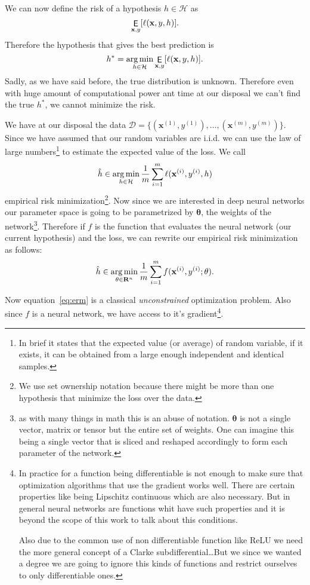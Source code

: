 \documentclass{sapthesis}
\begin{document}
We can now define the risk of a hypothesis $h \in \mathcal H$ as
\begin{displaymath}
	\mathop\mathsf E_{\mathbf x, y}[\ell(\mathbf x, y, h)] \mathrm .
\end{displaymath}
Therefore the hypothesis that gives the best prediction is
\begin{displaymath}
	h^* = \mathop{\mathrm{arg\,min}}_{h \in \mathcal H} \mathop\mathsf E_{\mathbf x, y}[\ell(\mathbf x, y, h)] \mathrm .
\end{displaymath}
Sadly, as we have said before, the true distribution is unknown. Therefore even
with huge amount of computational power ant time at our disposal we can't find
the true $h^*$, we cannot minimize the risk.

We have at our disposal the data $\mathcal D = \{(\mathbf x^{(1)}, y^{(1)}),
\ldots, (\mathbf x^{(m)}, y^{(m)})\}$. Since we have assumed that our random
variables are i.i.d. we can use the law of large numbers\footnote{In brief it
states that the expected value (or average) of random variable, if it exists, it
can be obtained from a large enough independent and identical samples.} to
estimate the expected value of the loss. We call
\begin{displaymath}
	\hat h \in \mathop{\mathrm{arg\,min}}_{h \in \mathcal H} \frac 1 m
		\sum_{i=1}^m \ell(\mathbf x^{(i)}, y^{(i)}, h)
\end{displaymath}
empirical risk minimization\footnote{We use set ownership notation because there
might be more than one hypothesis that minimize the loss over the data.}. Now
since we are interested in deep neural networks our parameter space is going to
be parametrized by $\mathbf \theta$, the weights of the network\footnote{as with
many things in math this is an abuse of notation. $\mathbf \theta$ is not a
single vector, matrix or tensor but the entire set of weights. One can imagine
this being a single vector that is sliced and reshaped accordingly to form each
parameter of the network.}. Therefore if $f$ is the function that evaluates the
neural network (our current hypothesis) and the loss, we can rewrite our
empirical risk minimization as follows:
\begin{equation}
	\hat h \in \mathop{\mathrm{arg\,min}}_{\mathbf \theta \in \mathbf R^n} \frac 1 m
		\sum_{i=1}^m f(\mathbf x^{(i)}, y^{(i)}; \theta) \mathrm .
		\label{eq:erm}
\end{equation}

Now equation~\ref{eq:erm} is a classical \emph{unconstrained} optimization
problem. Also since $f$ is a neural network, we have access to it's
gradient\footnote{In practice for a function being differentiable is not enough
to make sure that optimization algorithms that use the gradient works well.
There are certain properties like being Lipschitz continuous which are also
necessary. But in general neural networks are functions whit have such
properties and it is beyond the scope of this work to talk about this
conditions.

Also due to the common use of non differentiable function like ReLU we need the
more general concept of a Clarke subdifferential\dots But we since we wanted a
degree we are going to ignore this kinds of functions and restrict ourselves to
only differentiable ones.}.
\end{document}
